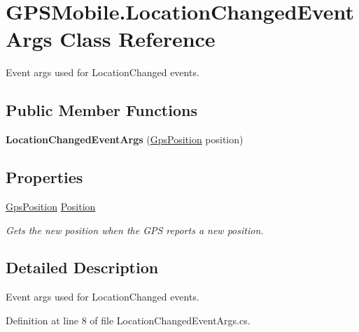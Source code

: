 \hypertarget{class_g_p_s_mobile_1_1_location_changed_event_args}{
\section{GPSMobile.LocationChangedEventArgs Class Reference}
\label{class_g_p_s_mobile_1_1_location_changed_event_args}
}


Event args used for LocationChanged events.  
\subsection*{Public Member Functions}
\begin{DoxyCompactItemize}
\item 
\hypertarget{class_g_p_s_mobile_1_1_location_changed_event_args_a344999840c45d222af31a193bfa68ab9}{
{\bfseries LocationChangedEventArgs} (\hyperlink{class_g_p_s_mobile_1_1_gps_position}{GpsPosition} position)}
\label{class_g_p_s_mobile_1_1_location_changed_event_args_a344999840c45d222af31a193bfa68ab9}

\end{DoxyCompactItemize}
\subsection*{Properties}
\begin{DoxyCompactItemize}
\item 
\hyperlink{class_g_p_s_mobile_1_1_gps_position}{GpsPosition} \hyperlink{class_g_p_s_mobile_1_1_location_changed_event_args_af8f0873f2d88ac2838080e44315ce790}{Position}
\begin{DoxyCompactList}\small\item\em Gets the new position when the GPS reports a new position. \item\end{DoxyCompactList}\end{DoxyCompactItemize}


\subsection{Detailed Description}
Event args used for LocationChanged events. 

Definition at line 8 of file LocationChangedEventArgs.cs.

